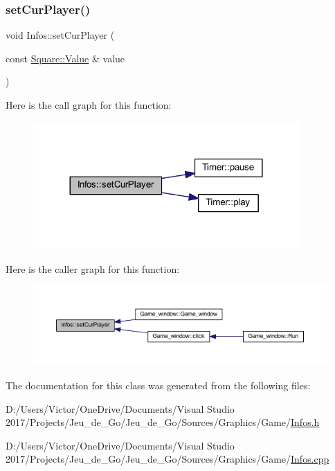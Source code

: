 \subsubsection{\texorpdfstring{set\+Cur\+Player()}{setCurPlayer()}}
{\footnotesize\ttfamily void Infos\+::set\+Cur\+Player (\begin{DoxyParamCaption}\item[{const \hyperlink{class_square_a7feeec236c037a9849114226adaa4ecc}{Square\+::\+Value} \&}]{value }\end{DoxyParamCaption})}

Here is the call graph for this function\+:
\nopagebreak
\begin{figure}[H]
\begin{center}
\leavevmode
\includegraphics[width=288pt]{class_infos_a5dee8a8817c307c570db905429480d79_cgraph}
\end{center}
\end{figure}
Here is the caller graph for this function\+:
\nopagebreak
\begin{figure}[H]
\begin{center}
\leavevmode
\includegraphics[width=350pt]{class_infos_a5dee8a8817c307c570db905429480d79_icgraph}
\end{center}
\end{figure}


The documentation for this class was generated from the following files\+:\begin{DoxyCompactItemize}
\item 
D\+:/\+Users/\+Victor/\+One\+Drive/\+Documents/\+Visual Studio 2017/\+Projects/\+Jeu\+\_\+de\+\_\+\+Go/\+Jeu\+\_\+de\+\_\+\+Go/\+Sources/\+Graphics/\+Game/\hyperlink{_infos_8h}{Infos.\+h}\item 
D\+:/\+Users/\+Victor/\+One\+Drive/\+Documents/\+Visual Studio 2017/\+Projects/\+Jeu\+\_\+de\+\_\+\+Go/\+Jeu\+\_\+de\+\_\+\+Go/\+Sources/\+Graphics/\+Game/\hyperlink{_infos_8cpp}{Infos.\+cpp}\end{DoxyCompactItemize}
